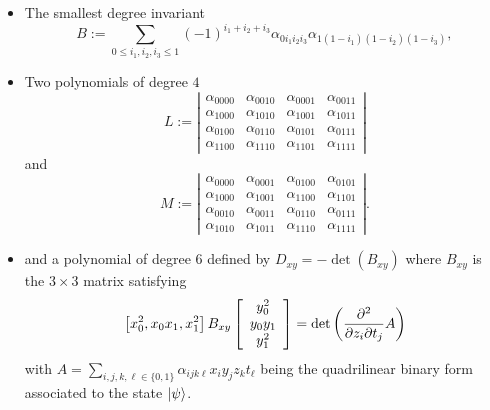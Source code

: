 \documentclass[a4paper,12pt,fleqn]{article}
\renewcommand\leq{\leqslant}
\begin{document}
\begin{itemize}
	\item The smallest degree invariant
	\begin{equation}{}
	B:=\sum_{0\leq i_{1},i_{2},i_{3}\leq 1}(-1)^{i_{1}+i_{2}+i_{3}}\alpha_{0i_{1}i_{2}i_{3}}\alpha_{1(1-i_{1})(1-i_{2})(1-i_{3})},
	\end{equation}
	\item Two polynomials of degree $4$
	\begin{equation}
		L:=\left|\begin{array}{cccc}\alpha_{0000}&\alpha_{0010}&\alpha_{0001}&\alpha_{0011}\\
		\alpha_{1000}&\alpha_{1010}&\alpha_{1001}&\alpha_{1011}\\
		\alpha_{0100}&\alpha_{0110}&\alpha_{0101}&\alpha_{0111}\\
		\alpha_{1100}&\alpha_{1110}&\alpha_{1101}&\alpha_{1111}\end{array}
		\right|\end{equation}  and 
		\begin{equation} 
		M:=\left|\begin{array}{cccc} \alpha_{0000}&\alpha_{0001}&\alpha_{0100}&\alpha_{0101}\\
		 \alpha_{1000}&\alpha_{1001}&\alpha_{1100}&\alpha_{1101}\\
		  \alpha_{0010}&\alpha_{0011}&\alpha_{0110}&\alpha_{0111}\\
		   \alpha_{1010}&\alpha_{1011}&\alpha_{1110}&\alpha_{1111}\end{array}\right|.
	\end{equation}
	\item and a polynomial of degree $6$ defined by $D_{xy}=-\det(B_{xy})$ where $B_{xy}$ is the $3\times 3$ matrix satisfying
	\begin{equation}
		\left[x_{0}^{2},x_{0}x_{1},x_{1}^{2}\right]B_{xy}\left[\begin{array}{c} y_{0}^{2}\\y_{0}y_{1}\\y_{1}^{2}\end{array}\right]=\det\left({\partial^{2}\over\partial z_{i}\partial t_{j}}A\right)
	\end{equation}
\noindent with $A=\sum\limits_{i,j,k,\ell\in\{0,1\}}\alpha_{ijk\ell}x_{i}y_{j}z_{k}t_{\ell}$ being the quadrilinear binary form associated to the state $\ket{\psi}$.
\end{itemize}
\end{document}
